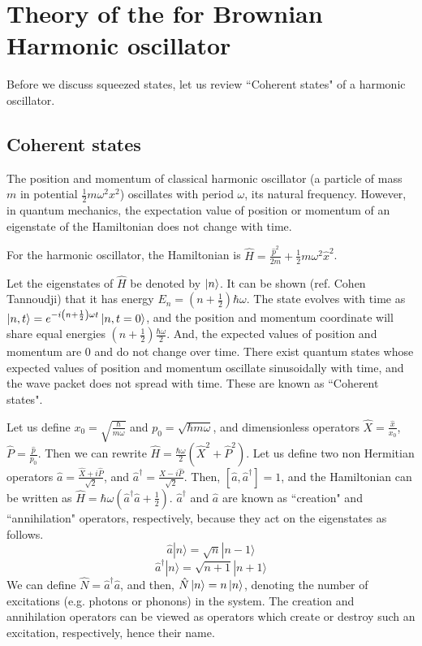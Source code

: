 \documentclass[12pt, twoside]{article}
\begin{document}
\section{Theory of the for Brownian Harmonic oscillator}

Before we discuss squeezed states, let us review ``Coherent states" of a harmonic oscillator.
\subsection{Coherent states}
The position and momentum of classical harmonic oscillator (a particle of mass $m$ in potential $\frac{1}{2}m\omega^2x^2$)  oscillates with period $\omega$, its natural frequency.
However, in quantum mechanics, the expectation value of position or momentum of an eigenstate of the Hamiltonian does not change with time.


For the harmonic oscillator, the Hamiltonian is $\hat{H} = \frac{\hat{p}^2}{2m} + \frac{1}{2}m \omega^2 {\hat{x}}^2$.


Let the eigenstates of $\hat{H}$ be denoted by $\ket{n}$. It can be shown (ref. Cohen Tannoudji) that it has energy $E_n = (n+\frac{1}{2}) \hbar\omega$. The state evolves with time as $\ket{n,t} = e ^ { -i \left( n + \frac { 1 } { 2 } \right) \omega t } \ket{n,t=0}$, and the position and momentum coordinate will share equal energies $(n+\frac{1}{2}) \frac{\hbar\omega}{2}$. And, the expected values of position and momentum are $0$ and do not change over time.
There exist quantum states whose expected values of position and momentum oscillate sinusoidally with time, and the wave packet does not spread with time. These are known as ``Coherent states".


Let us define $x_0 = \sqrt{\frac{\hbar}{m\omega}}$ and $p_0 = \sqrt{\hbar m \omega}$, and dimensionless operators $\hat{X} = \frac{\hat{x}}{x_0}$,$\hat{P} = \frac{\hat{p}}{p_0}$. Then we can rewrite $\hat{H} = \frac{\hbar\omega}{2}({\hat{X}}^2 + {\hat{P}}^2)$. Let us define two non Hermitian operators $\hat{a} = \frac{\hat{X} + i \hat{P}}{\sqrt{2}}$, and ${\hat{a}}^\dagger = \frac{\hat{X} - i \hat{P}}{\sqrt{2}}$. Then, $[\hat{a},\hat{a}^\dagger] = 1$, and the Hamiltonian can be written as $\hat{H} = \hbar\omega( \hat{a}^\dagger \hat{a} + \frac{1}{2})$.
$\hat{a}^\dagger$ and $\hat{a}$ are known as ``creation" and ``annihilation" operators, respectively, because they act on the eigenstates as follows. 
\begin{equation}\label{eq:a} { \hat{a} | n \rangle = \sqrt { n } | n - 1 \rangle } \end{equation}
\begin{equation} \label{eq:adagger}{ \hat{a} ^ { \dagger } | n \rangle = \sqrt { n + 1 } | n + 1 \rangle }\end{equation} 
We can define $\hat{N} = \hat{a}^\dagger\hat{a}$, and then, $\hat{N} \ket{n} = n\ket{n}$, denoting the number of excitations (e.g. photons or phonons) in the system. The creation and annihilation operators can be viewed as operators which create or destroy such an excitation, respectively, hence their name.
\end{document}

